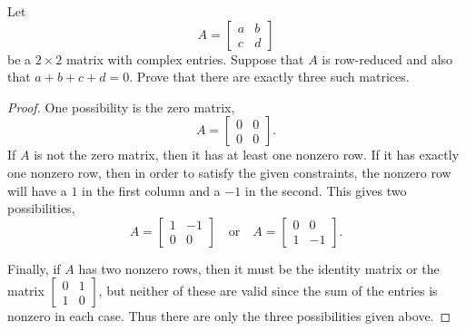  Let
\begin{equation*}
  A =
  \begin{bmatrix}
    a & b \\
    c & d
  \end{bmatrix}
\end{equation*}
be a $2\times2$ matrix with complex entries. Suppose that $A$ is
row-reduced and also that $a + b + c + d = 0$. Prove that there are
exactly three such matrices.
\begin{proof}
  One possibility is the zero matrix,
  \begin{equation*}
    A =
    \begin{bmatrix}
      0 & 0 \\
      0 & 0
    \end{bmatrix}.
  \end{equation*}
  If $A$ is not the zero matrix, then it has at least one nonzero
  row. If it has exactly one nonzero row, then in order to satisfy the
  given constraints, the nonzero row will have a $1$ in the first
  column and a $-1$ in the second. This gives two possibilities,
  \begin{equation*}
    A =
    \begin{bmatrix}
      1 & -1 \\
      0 & 0
    \end{bmatrix}
    \quad\text{or}\quad
    A =
    \begin{bmatrix}
      0 & 0 \\
      1 & -1
    \end{bmatrix}.
  \end{equation*}

  Finally, if $A$ has two nonzero rows, then it must be the identity
  matrix or the matrix
  $\left[\begin{smallmatrix} 0 & 1 \\ 1 & 0 \end{smallmatrix}\right]$,
  but neither of these are valid since the sum of the entries is
  nonzero in each case. Thus there are only the three possibilities
  given above.
\end{proof}
